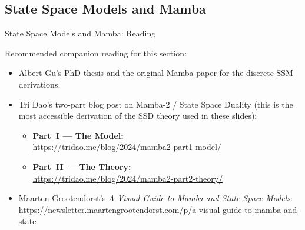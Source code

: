 



\subsection{State Space Models and Mamba}

\begin{frame}{State Space Models and Mamba: Reading}

  Recommended companion reading for this section:
  \begin{itemize}
    \item Albert Gu's PhD thesis and the original Mamba paper for the discrete SSM derivations.
    \item Tri Dao's two-part blog post on Mamba-2 / State Space Duality (this is the most accessible derivation of the SSD theory used in these slides):
      \begin{itemize}
        \item \textbf{Part~I --- The Model:}\\
          \url{https://tridao.me/blog/2024/mamba2-part1-model/}
        \item \textbf{Part~II --- The Theory:}\\
          \url{https://tridao.me/blog/2024/mamba2-part2-theory/}
      \end{itemize}
    \item Maarten Grootendorst's \emph{A Visual Guide to Mamba and State Space Models}:\\
      \url{https://newsletter.maartengrootendorst.com/p/a-visual-guide-to-mamba-and-state}
  \end{itemize}
\end{frame}

